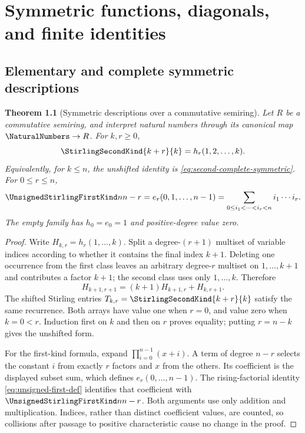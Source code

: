 \documentclass[11pt,a4paper,oneside,openany]{book}
\newtheorem{theorem}{Theorem}[chapter]
\theoremstyle{definition}
\theoremstyle{remark}
\begin{document}
\chapter{Symmetric functions, diagonals, and finite identities}
\label{ch:stirling-identities}

\section{Elementary and complete symmetric descriptions}
\begin{theorem}[Symmetric descriptions over a commutative semiring]
\label{thm:stirling-symmetric-semirings}
Let $R$ be a commutative semiring, and interpret natural numbers through its
canonical map $\NaturalNumbers\to R$.  For $k,r\ge0$,
\[
 \StirlingSecondKind{k+r}{k}=h_r(1,2,\ldots,k).
\]
Equivalently, for $k\le n$, the unshifted identity is
\cref{eq:second-complete-symmetric}.  For $0\le r\le n$,
\begin{equation}\label{eq:first-elementary}
 \UnsignedStirlingFirstKind n{n-r}=e_r(0,1,\ldots,n-1)
 =\sum_{0\le i_1<\cdots<i_r<n}i_1\cdots i_r.
\end{equation}
The empty family has $h_0=e_0=1$ and positive-degree value zero.
\end{theorem}
\begin{proof}
Write $H_{k,r}=h_r(1,\ldots,k)$.  Split a degree-$(r+1)$ multiset of
variable indices according to whether it contains the final index $k+1$.
Deleting one occurrence from the first class leaves an arbitrary degree-$r$
multiset on $1,\ldots,k+1$ and contributes a factor $k+1$; the second class
uses only $1,\ldots,k$.  Therefore
\[
 H_{k+1,r+1}=(k+1)H_{k+1,r}+H_{k,r+1}.
\]
The shifted Stirling entries $T_{k,r}=\StirlingSecondKind{k+r}{k}$ satisfy
the same recurrence.  Both arrays have value one when $r=0$, and value zero
when $k=0<r$.  Induction first on $k$ and then on $r$ proves equality;
putting $r=n-k$ gives the unshifted form.

For the first-kind formula, expand $\prod_{i=0}^{n-1}(x+i)$.  A term of
degree $n-r$ selects the constant $i$ from exactly $r$ factors and $x$ from
the others.  Its coefficient is the displayed subset sum, which defines
$e_r(0,\ldots,n-1)$.  The rising-factorial identity
\cref{eq:unsigned-first-def} identifies that coefficient with
$\UnsignedStirlingFirstKind n{n-r}$.  Both arguments use only addition and
multiplication.  Indices, rather than distinct coefficient values, are
counted, so collisions after passage to positive characteristic cause no
change in the proof.
\end{proof}
\end{document}
